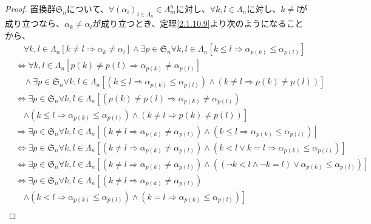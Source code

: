 \documentclass[dvipdfmx]{jsarticle}
\begin{document}
\begin{proof}
置換群$\mathfrak{S}_{n}$について、$\forall\left( \alpha_{i} \right)_{i \in \varLambda_{n}} \in \varLambda_{m}^{n}$に対し、$\forall k,l \in \varLambda_{n}$に対し、$k \neq l$が成り立つなら、$\alpha_{k} \neq \alpha_{l}$が成り立つとき、定理\ref{2.1.10.9}より次のようになることから、
\begin{align*}
&\quad \forall k,l \in \varLambda_{n}\left[ k \neq l \Rightarrow \alpha_{k} \neq \alpha_{l} \right] \land \exists p \in \mathfrak{S}_{n}\forall k,l \in \varLambda_{n}\left[ k \leq l \Rightarrow \alpha_{p(k)} \leq \alpha_{p(l)} \right]\\
&\Leftrightarrow \forall k,l \in \varLambda_{n}\left[ p(k) \neq p(l) \Rightarrow \alpha_{p(k)} \neq \alpha_{p(l)} \right] \\
&\quad \land \exists p \in \mathfrak{S}_{n}\forall k,l \in \varLambda_{n}\left[ \left( k \leq l \Rightarrow \alpha_{p(k)} \leq \alpha_{p(l)} \right) \land \left( k \neq l \Rightarrow p(k) \neq p(l) \right) \right]\\
&\Leftrightarrow \exists p \in \mathfrak{S}_{n}\forall k,l \in \varLambda_{n}\left[ \left( p(k) \neq p(l) \Rightarrow \alpha_{p(k)} \neq \alpha_{p(l)} \right) \right. \\
&\quad \left. \land \left( k \leq l \Rightarrow \alpha_{p(k)} \leq \alpha_{p(l)} \right) \land \left( k \neq l \Rightarrow p(k) \neq p(l) \right) \right]\\
&\Rightarrow \exists p \in \mathfrak{S}_{n}\forall k,l \in \varLambda_{n}\left[ \left( k \neq l \Rightarrow \alpha_{p(k)} \neq \alpha_{p(l)} \right) \land \left( k \leq l \Rightarrow \alpha_{p(k)} \leq \alpha_{p(l)} \right) \right]\\
&\Leftrightarrow \exists p \in \mathfrak{S}_{n}\forall k,l \in \varLambda_{n}\left[ \left( k \neq l \Rightarrow \alpha_{p(k)} \neq \alpha_{p(l)} \right) \land \left( k < l \vee k = l \Rightarrow \alpha_{p(k)} \leq \alpha_{p(l)} \right) \right]\\
&\Leftrightarrow \exists p \in \mathfrak{S}_{n}\forall k,l \in \varLambda_{n}\left[ \left( k \neq l \Rightarrow \alpha_{p(k)} \neq \alpha_{p(l)} \right) \land \left( (\neg k < l \land \neg k = l) \vee \alpha_{p(k)} \leq \alpha_{p(l)} \right) \right]\\
&\Leftrightarrow \exists p \in \mathfrak{S}_{n}\forall k,l \in \varLambda_{n}\left[ \left( k \neq l \Rightarrow \alpha_{p(k)} \neq \alpha_{p(l)} \right) \right. \\
&\quad \left. \land \left( k < l \Rightarrow \alpha_{p(k)} \leq \alpha_{p(l)} \right) \land \left( k = l \Rightarrow \alpha_{p(k)} \leq \alpha_{p(l)} \right) \right]\\

\end{align*}
\end{proof}
\end{document}
